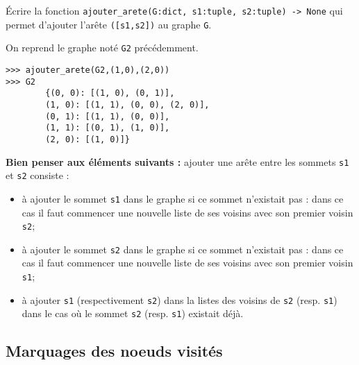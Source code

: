 \begin{question}
Écrire la fonction \lstinline{ajouter_arete(G:dict, s1:tuple, s2:tuple) -> None} qui permet d'ajouter l'arête \lstinline{([s1,s2])} au graphe \lstinline{G}. 
\end{question}

\begin{exemple}
On reprend le graphe noté \lstinline{G2} précédemment. 
\begin{lstlisting}
>>> ajouter_arete(G2,(1,0),(2,0))
>>> G2
        {(0, 0): [(1, 0), (0, 1)],
        (1, 0): [(1, 1), (0, 0), (2, 0)],
        (0, 1): [(1, 1), (0, 0)],
        (1, 1): [(0, 1), (1, 0)],
        (2, 0): [(1, 0)]}
\end{lstlisting}
\end{exemple}


\textbf{Bien penser aux éléments suivants :} ajouter une arête entre les sommets \lstinline{s1} et \lstinline{s2} consiste :
\begin{itemize}
\item à ajouter le sommet \lstinline{s1} dans le graphe si ce sommet n'existait pas : dans ce cas il faut commencer une nouvelle liste de ses voisins avec son premier voisin \lstinline{s2};
\item à ajouter le sommet \lstinline{s2} dans le graphe si ce sommet n'existait pas : dans ce cas il faut commencer une nouvelle liste de ses voisins avec son premier voisin \lstinline{s1};
\item à ajouter \lstinline{s1} (respectivement \lstinline{s2}) dans la listes des voisins de \lstinline{s2} (resp. \lstinline{s1}) dans le cas où le sommet \lstinline{s2} (resp. \lstinline{s1}) existait déjà.
\end{itemize}


\subsection*{Marquages des noeuds visités}

